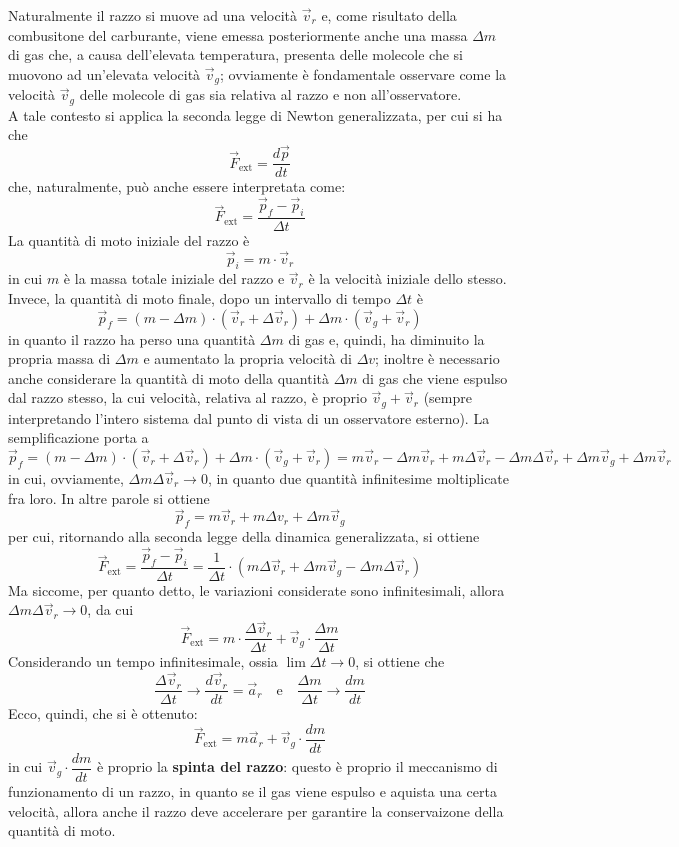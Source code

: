 \documentclass[a4paper]{extarticle}
\begin{document}
\noindent
Naturalmente il razzo si muove ad una velocità $\vec v_r$ e, come risultato della combusitone del carburante, viene emessa posteriormente anche una massa $\Delta m$ di gas che, a causa dell'elevata temperatura, presenta delle molecole che si muovono ad un'elevata velocità $\vec v_g$; ovviamente è fondamentale osservare come la velocità $\vec v_g$ delle molecole di gas sia relativa al razzo e non all'osservatore.\\
A tale contesto si applica la seconda legge di Newton generalizzata, per cui si ha che
\[\vec F_{\text{ext}} = \frac{d\vec p}{dt}\]
che, naturalmente, può anche essere interpretata come:
\[\vec F_{\text{ext}} = \frac{\vec p_f - \vec p_i}{\Delta t}\]
La quantità di moto iniziale del razzo è
\[\vec p_i = m \cdot \vec v_r\]
in cui $m$ è la massa totale iniziale del razzo e $\vec v_r$ è la velocità iniziale dello stesso. Invece, la quantità di moto finale, dopo un intervallo di tempo $\Delta t$ è
\[\vec p_f = \left(m - \Delta m\right) \cdot \left(\vec v_r + \Delta \vec v_r\right) + \Delta m \cdot \left(\vec v_g + \vec v_r\right)\]
in quanto il razzo ha perso una quantità $\Delta m$ di gas e, quindi, ha diminuito la propria massa di $\Delta m$ e aumentato la propria velocità di $\Delta v$; inoltre è necessario anche considerare la quantità di moto della quantità $\Delta m$ di gas che viene espulso dal razzo stesso, la cui velocità, relativa al razzo, è proprio $\vec v_g + \vec v_r$ (sempre interpretando l'intero sistema dal punto di vista di un osservatore esterno). La semplificazione porta a
\[\vec p_f = \left(m - \Delta m\right) \cdot \left(\vec v_r + \Delta \vec v_r\right) + \Delta m \cdot \left(\vec v_g + \vec v_r\right) = m\vec v_r - \Delta m \vec v_r + m \Delta \vec v_r - \Delta m \Delta \vec v_r + \Delta m \vec v_g + \Delta m \vec v_r\]
in cui, ovviamente, $\Delta m \Delta \vec v_r \to 0$, in quanto due quantità infinitesime moltiplicate fra loro. In altre parole si ottiene
\[\vec p_f = m \vec v_r + m \Delta v_r + \Delta m \vec v_g\]
per cui, ritornando alla seconda legge della dinamica generalizzata, si ottiene
\[\vec F_{\text{ext}} = \frac{\vec p_f - \vec p_i}{\Delta t}=\frac{1}{\Delta t} \cdot \left(m \Delta \vec v_r + \Delta m \vec v_g - \Delta m \Delta \vec v_r\right)\]
Ma siccome, per quanto detto, le variazioni considerate sono infinitesimali, allora $\Delta m \Delta \vec v_r \to 0$, da cui
\[\vec F_{\text{ext}} = m \cdot \frac{\Delta \vec v_r}{\Delta t} + \vec v_g \cdot \frac{\Delta m}{\Delta t}\]
Considerando un tempo infinitesimale, ossia $\displaystyle{\lim \Delta t \to 0}$, si ottiene che
\[\frac{\Delta \vec v_r}{\Delta t} \longrightarrow \frac{d \vec v_r}{dt} = \vec a_r \hspace{1em} \text{e} \hspace{1em} \frac{\Delta m}{\Delta t} \longrightarrow \frac{dm}{dt}\]
Ecco, quindi, che si è ottenuto:
\[\boxed{\vec F_{\text{ext}} = m \vec a_r + \vec v_g \cdot \frac{dm}{dt}}\]
in cui $\vec v_g \cdot \dfrac{dm}{dt}$ è proprio la \textbf{spinta del razzo}: questo è proprio il meccanismo di funzionamento di un razzo, in quanto se il gas viene espulso e aquista una certa velocità, allora anche il razzo deve accelerare per garantire la conservaizone della quantità di moto.
\end{document}
